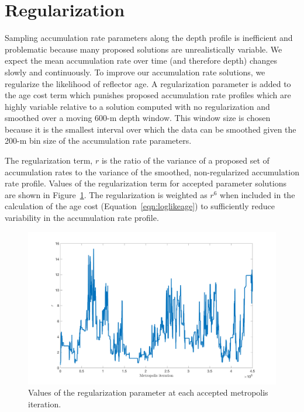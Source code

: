 \section{Regularization}\label{sec:regularization}

Sampling accumulation rate parameters along the depth profile is inefficient and problematic because many proposed solutions are unrealistically variable. We expect the mean accumulation rate over time (and therefore depth) changes slowly and continuously. To improve our accumulation rate solutions, we regularize the likelihood of reflector age. A regularization parameter is added to the age cost term which punishes proposed accumulation rate profiles which are highly variable relative to a solution computed with no regularization and smoothed over a moving 600-m depth window. This window size is chosen because it is the smallest interval over which the data can be smoothed given the 200-m bin size of the accumulation rate parameters. 

The regularization term, $r$ is the ratio of the variance of a proposed set of accumulation rates to the variance of the smoothed, non-regularized accumulation rate profile. Values of the regularization term for accepted parameter solutions are shown in Figure~\ref{fig:reg}. The regularization is weighted as $r^6$ when included in the calculation of the age cost (Equation~\ref{eqn:loglikeage}) to sufficiently reduce variability in the accumulation rate profile. 


\begin{figure}[ht]
\centering
\includegraphics[scale=0.4]{../analysis/figures/regularization}
\caption[]{Values of the regularization parameter at each accepted metropolis iteration.}
\label{fig:reg}
\end{figure}








